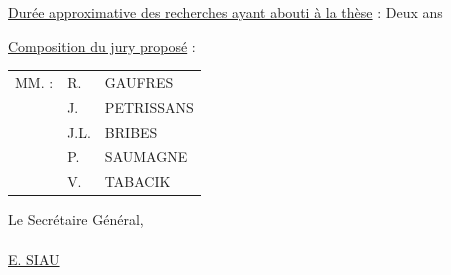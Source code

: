 \uline{Durée approximative des recherches ayant abouti à la thèse} : Deux ans

\uline{Composition du jury proposé} :
\begin{center}
\begin{tabular}{@{}lll@{}}
MM. : & R. & GAUFRES\\
 & J. & PETRISSANS\\
 & J.L. & BRIBES\\
 & P. & SAUMAGNE\\
 & V. & TABACIK
\end{tabular}
\end{center}

\begin{flushright}
Le Secrétaire Général,\\
\\
\uline{E. SIAU}\\
\end{flushright}
